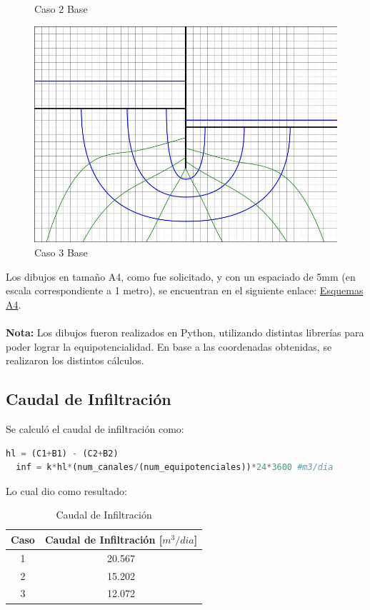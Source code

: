 \begin{figure}[H]
\begin{minipage}{0.32\textwidth}
      \caption{Caso 2 Base}
  \end{minipage}
  \begin{minipage}{0.32\textwidth}
      \centering
      \includegraphics[width=\textwidth]{FOTOS/caso_3dibujo_base.jpg}
      \caption{Caso 3 Base}
  \end{minipage}
\end{figure}

Los dibujos en tamaño A4, como fue solicitado, y con un espaciado de 5mm (en escala correspondiente a 1 metro), se encuentran en el siguiente enlace: \href{https://github.com/LukasWolff2002/PROYECTO_1_MCOC/tree/main/DIBUJOS_A4}{Esquemas A4}.
\\ \\
\textbf{Nota:} Los dibujos fueron realizados en Python, utilizando distintas librerías para poder lograr la equipotencialidad. En base a las coordenadas obtenidas, se realizaron los distintos cálculos.

\subsection{Caudal de Infiltración}

Se calculó el caudal de infiltración como:

\begin{lstlisting}[language=Python]
  hl = (C1+B1) - (C2+B2)
  inf = k*hl*(num_canales/(num_equipotenciales))*24*3600 #m3/dia
\end{lstlisting}

Lo cual dio como resultado:

\begin{table}[H]
  \centering
  \begin{tabular}{|c|c|}
    \hline
    Caso & Caudal de Infiltración [$m^3/dia$] \\
    \hline
    1 & 20.567 \\ \hline
    2 & 15.202 \\ \hline
    3 & 12.072 \\
    \hline
  \end{tabular}
  \caption{Caudal de Infiltración}
\end{table}

